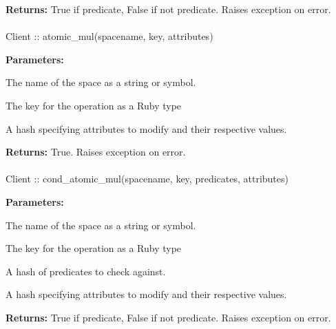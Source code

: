 \noindent\textbf{Returns:}
True if predicate, False if not predicate.  Raises exception on error.

\paragraph{}
\begin{ccode}
Client :: atomic_mul(spacename, key, attributes)
\end{ccode}
\funcdesc 

\noindent\textbf{Parameters:}
\begin{description}[labelindent=\widthof{{\code{attributes}}},leftmargin=*,noitemsep,nolistsep,align=right]
\item[\code{spacename}] The name of the space as a string or symbol.
\item[\code{key}] The key for the operation as a Ruby type
\item[\code{attributes}] A hash specifying attributes to modify and their respective values.
\end{description}

\noindent\textbf{Returns:}
True.  Raises exception on error.

\paragraph{}
\begin{ccode}
Client :: cond_atomic_mul(spacename, key, predicates, attributes)
\end{ccode}
\funcdesc 

\noindent\textbf{Parameters:}
\begin{description}[labelindent=\widthof{{\code{predicates}}},leftmargin=*,noitemsep,nolistsep,align=right]
\item[\code{spacename}] The name of the space as a string or symbol.
\item[\code{key}] The key for the operation as a Ruby type
\item[\code{predicates}] A hash of predicates to check against.
\item[\code{attributes}] A hash specifying attributes to modify and their respective values.
\end{description}

\noindent\textbf{Returns:}
True if predicate, False if not predicate.  Raises exception on error.

